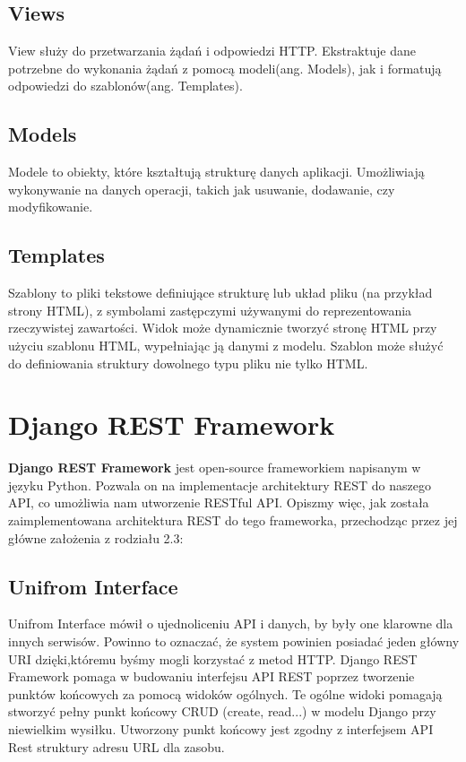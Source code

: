 \documentclass[oneside,polski,logo,indent]{amuthesis}
\begin{document}
\begin{center}
\subsection{Views}
\end{center}
View służy do przetwarzania żądań i odpowiedzi HTTP. Ekstraktuje dane potrzebne do wykonania żądań z pomocą modeli(ang. Models), jak i formatują odpowiedzi do szablonów(ang. Templates).


\begin{center}
\subsection{Models}
\end{center}
Modele to obiekty, które kształtują strukturę danych aplikacji. Umożliwiają wykonywanie na danych operacji, takich jak usuwanie, dodawanie, czy modyfikowanie. 


\begin{center}
\subsection{Templates}
\end{center}
Szablony to pliki tekstowe definiujące strukturę lub układ pliku (na przykład strony HTML), z symbolami zastępczymi używanymi do reprezentowania rzeczywistej zawartości. Widok może dynamicznie tworzyć stronę HTML przy użyciu szablonu HTML, wypełniając ją danymi z modelu. Szablon może służyć do definiowania struktury dowolnego typu pliku nie tylko HTML.

\section{Django REST Framework}
\textbf{Django REST Framework} jest open-source frameworkiem napisanym w języku Python. Pozwala on na implementacje architektury REST do naszego API, co umożliwia nam utworzenie RESTful API. Opiszmy więc, jak została zaimplementowana architektura REST do tego frameworka, przechodząc przez jej główne założenia z rodziału 2.3:

\begin{center}
\subsection{Unifrom Interface}
\end{center}
Unifrom Interface mówił o ujednoliceniu API i danych, by były one klarowne dla innych serwisów. Powinno to oznaczać, że system powinien posiadać jeden główny URI dzięki,\break któremu byśmy mogli korzystać z metod HTTP. Django REST Framework pomaga w budowaniu interfejsu API REST poprzez tworzenie punktów końcowych za pomocą widoków ogólnych. Te ogólne widoki pomagają stworzyć pełny punkt końcowy CRUD (create, read...) w modelu Django przy niewielkim wysiłku. Utworzony punkt końcowy jest zgodny z interfejsem API Rest struktury adresu URL dla zasobu. 
\end{document}
